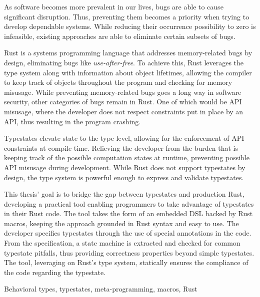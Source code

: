 

As software becomes more prevalent in our lives, bugs are able to cause significant disruption.
Thus, preventing them becomes a priority when trying to develop dependable systems.
While reducing their occurrence possibility to zero is infeasible,
existing approaches are able to eliminate certain subsets of bugs.

Rust is a systems programming language that addresses memory-related bugs by design,
eliminating bugs like \emph{use-after-free}.
To achieve this, Rust leverages the type system along with information about object lifetimes,
allowing the compiler to keep track of objects throughout the program and checking for memory misusage.
While preventing memory-related bugs goes a long way in software security, other categories of bugs remain in Rust.
One of which would be API misusage, where the developer does not respect constraints put in place by an API,
thus resulting in the program crashing.

Typestates elevate state to the type level, allowing for the enforcement of API constraints at compile-time.
Relieving the developer from the burden that is keeping track of the possible computation states at runtime,
preventing possible API misusage during development.
While Rust does not support typestates by design,
the type system is powerful enough to express and validate typestates.

This thesis' goal is to bridge the gap between typestates and production Rust,
developing a practical tool enabling programmers to take advantage of typestates in their Rust code.
The tool takes the form of an embedded DSL backed by Rust macros,
keeping the approach grounded in Rust syntax and easy to use.
The developer specifies typestates through the use of special annotations in the code.
From the specification, a state machine is extracted and checked for common typestate pitfalls,
thus providing correctness properties beyond simple typestates.
The tool, leveraging on Rust's type system, statically ensures the compliance of the code regarding the typestate.

\begin{keywords}
Behavioral types, typestates, meta-programming, macros, Rust
\end{keywords}
